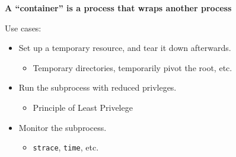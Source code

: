 \begin{frame}

\begin{center}

\large \textbf{A ``container'' is a process that wraps another process}

\end{center}

\pause

\vspace{\fill}

Use cases:

\begin{itemize}

\item Set up a temporary resource, and tear it down afterwards.

\begin{itemize}

\item Temporary directories, temporarily pivot the root, etc.

\end{itemize}

\item Run the subprocess with reduced privleges.

\begin{itemize}

\item Principle of Least Privelege

\end{itemize}

\item Monitor the subprocess.

\begin{itemize}

\item \texttt{strace}, \texttt{time}, etc.

\end{itemize}

\end{itemize}

\end{frame}


